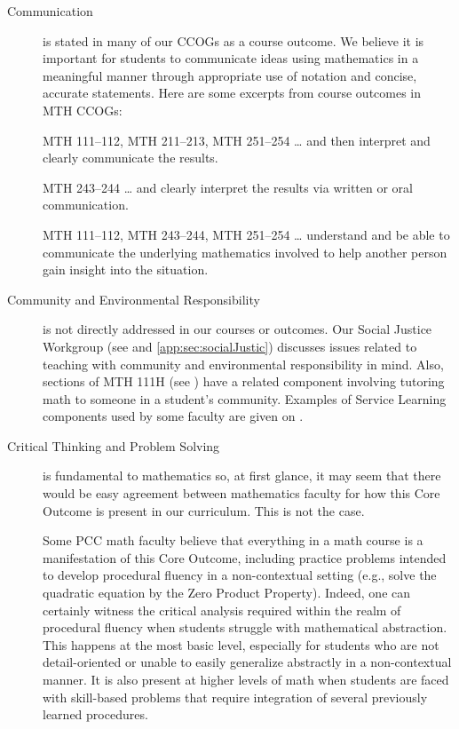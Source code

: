 \begin{description}
	\item[Communication] is stated in many of our CCOGs as a course outcome.
	      We believe it is important for students to communicate ideas using mathematics in a meaningful manner through appropriate use of notation and concise, accurate statements.
	      Here are some excerpts from course outcomes in MTH CCOGs:
	      \begin{aquote}{MTH 111--112, MTH 211--213, MTH 251--254} {\ldots}
		      and then interpret and clearly communicate the results.
	      \end{aquote}

	      \begin{aquote}{MTH 243--244}
		      {\ldots}
		      and clearly interpret the results via written or oral communication.
	      \end{aquote}

	      \begin{aquote}{MTH 111--112, MTH 243--244, MTH 251--254}
		      {\ldots}
		      understand and be able to communicate the underlying mathematics
		      involved to help another person gain insight into the situation.
	      \end{aquote}

	\item[Community and Environmental Responsibility] is not directly addressed in
	      our courses or outcomes.
	      Our Social Justice Workgroup (see  and \vref{app:sec:socialJustic}) discusses issues related to teaching with community and environmental responsibility in mind.
	      Also, sections of MTH 111H (see ) have a related component involving tutoring math to someone in a student's community.
	      Examples of Service Learning components used by some faculty are given on .

	\item[Critical Thinking and Problem Solving]
	      is fundamental to mathematics so, at first glance, it may seem that there would
	      be easy agreement between mathematics faculty for how this Core Outcome is
	      present in our curriculum.
	      This is not the case.

	      Some PCC math faculty believe that everything in a math course is a manifestation of this Core Outcome, including practice problems intended to develop procedural fluency in a non-contextual setting (e.g., solve the quadratic equation by the Zero Product Property).
	      Indeed, one can certainly witness the critical analysis required within the realm of procedural fluency when students struggle with  mathematical abstraction.
	      This happens at the most basic level, especially for students who are not detail-oriented or unable to easily generalize abstractly in a non-contextual manner.
	      It is also present at higher levels of math when students are faced with skill-based problems that require integration of several previously learned procedures.


\end{description}
